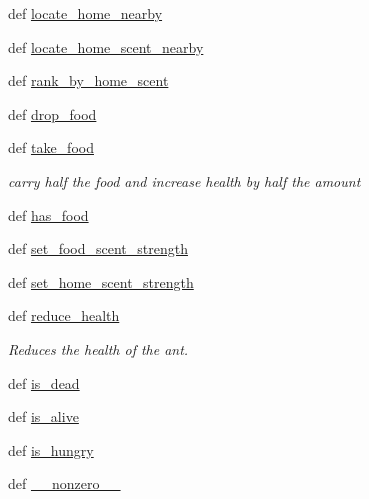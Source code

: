 \begin{DoxyCompactItemize}
def \hyperlink{classants_1_1Ant_a5795d0898e3d0d020a0a0a626a5ef7b0}{locate\+\_\+home\+\_\+nearby}
\item 
def \hyperlink{classants_1_1Ant_a81a141f3417ddb32b8d1abbd95bbc477}{locate\+\_\+home\+\_\+scent\+\_\+nearby}
\item 
def \hyperlink{classants_1_1Ant_a6f3e3bd98a5f382098cdc1c02e1e2fd0}{rank\+\_\+by\+\_\+home\+\_\+scent}
\item 
def \hyperlink{classants_1_1Ant_ae85884312b4aa10f965b84535bed37fc}{drop\+\_\+food}
\item 
def \hyperlink{classants_1_1Ant_accd1fa305032e848021a4d8b90f3f8ce}{take\+\_\+food}
\begin{DoxyCompactList}\small\item\em carry half the food and increase health by half the amount \end{DoxyCompactList}\item 
def \hyperlink{classants_1_1Ant_a41de1c29941a444dab25a88cbc3a881d}{has\+\_\+food}
\item 
def \hyperlink{classants_1_1Ant_ae90d1356ca3370e47c24c5fe63ebfeaf}{set\+\_\+food\+\_\+scent\+\_\+strength}
\item 
def \hyperlink{classants_1_1Ant_ae8234d6ecb9f7666e255ffa8a978355c}{set\+\_\+home\+\_\+scent\+\_\+strength}
\item 
def \hyperlink{classants_1_1Ant_a89ad26b1d79990f95979464bbd3bf9b8}{reduce\+\_\+health}
\begin{DoxyCompactList}\small\item\em Reduces the health of the ant. \end{DoxyCompactList}\item 
def \hyperlink{classants_1_1Ant_a218d9a25e9df83abf85ff596c214075c}{is\+\_\+dead}
\item 
def \hyperlink{classants_1_1Ant_a78620c709fca31c9a0b2994534082bdc}{is\+\_\+alive}
\item 
def \hyperlink{classants_1_1Ant_a16d8e187423f707e067fe2d562100437}{is\+\_\+hungry}
\item 
def \hyperlink{classants_1_1Ant_a9e4bf6309b80ab33bd628f6e7d78d013}{\+\_\+\+\_\+nonzero\+\_\+\+\_\+}
\end{DoxyCompactItemize}
